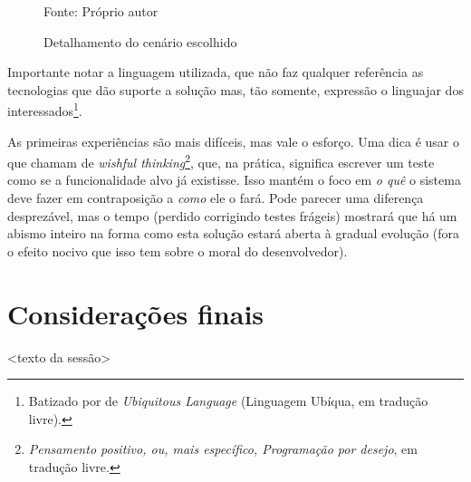       \begin{figure}[h]
        \centering
        \caption{Detalhamento do cenário escolhido}
        
        Fonte: Próprio autor\footnotemark
        \label{fig:passos-primeiro-cenario-escolhido}
      \end{figure}

      Importante notar a linguagem utilizada, que não faz qualquer referência as
      tecnologias que dão suporte a solução mas, tão somente, expressão o
      linguajar dos interessados\footnote{Batizado por
       de \emph{Ubiquitous Language} (Linguagem Ubíqua, em tradução
      livre).}.

      As primeiras experiências são mais difíceis, mas vale o esforço. Uma dica
      é usar o que  chamam de \emph{
      wishful thinking}\footnote{\emph{Pensamento positivo, ou, mais
      específico, Programação por desejo}, em tradução livre.}, que, na prática,
      significa escrever um teste como se a funcionalidade alvo já existisse.
      Isso mantém o foco em \emph{o quê} o sistema deve fazer em contraposição a
      \emph{como} ele o fará. Pode parecer uma diferença desprezável, mas o
      tempo (perdido corrigindo testes frágeis) mostrará que há um abismo
      inteiro na forma como esta solução estará aberta à gradual evolução (fora
      o efeito nocivo que isso tem sobre o moral do desenvolvedor).


  \section{Considerações finais}

    <texto da sessão>


  \clearpage

  \renewcommand\refname{Referências}

    
    


